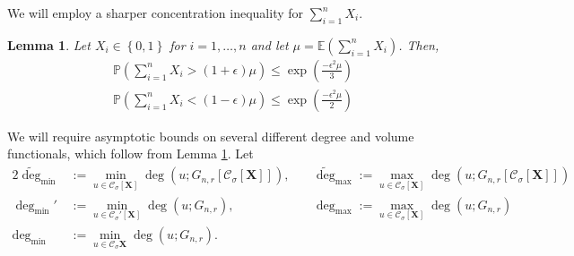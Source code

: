 \documentclass{article}
\newcommand{\set}[1]{\left\{#1\right\}}
\newcommand{\1}{\mathbf{1}}
\newcommand{\degminpr}{\deg_{\min}'}
\newcommand{\degminwt}{\widetilde{\deg}_{\min}}
\newcommand{\degmaxwt}{\widetilde{\deg}_{\max}}
\newcommand{\degmax}{\deg_{\max}}
\newcommand{\degmin}{\deg_{\min}}
\newcommand{\Xbf}{\mathbf{X}}
\newcommand{\Pbb}{\mathbb{P}}
\newcommand{\Ebb}{\mathbb{E}}
\newcommand{\Cset}{\mathcal{C}}
\newcommand{\Csig}{\Cset_{\sigma}}
\theoremstyle{aldenthm}
\newtheorem{lemma}{Lemma}
\begin{document}
We will employ a sharper concentration inequality for $\sum_{i = 1}^{n} X_i$.
\begin{lemma}
	\label{lem: multiplicative_Hoeffding}
	Let $X_i \in \set{0,1}$ for $i = 1, \ldots, n$ and let $\mu = \Ebb(\sum_{i = 1}^n X_i)$. Then,
	\begin{align*}
	\Pbb\left(\sum_{i=1}^{n}X_i > (1 + \epsilon) \mu \right) \leq \exp \left(\frac{-\epsilon^2 \mu}{3}\right) \\
	\Pbb\left(\sum_{i=1}^{n}X_i < (1 - \epsilon) \mu \right) \leq \exp \left(\frac{-\epsilon^2 \mu}{2}\right)
	\end{align*}
\end{lemma}

We will require asymptotic bounds on several different degree and volume functionals, which follow from Lemma \ref{lem: multiplicative_Hoeffding}. Let
\begin{alignat*}{2}
\degminwt & := \min_{u \in \Csig[\Xbf]} \deg(u; G_{n,r}\left[\Csig[\Xbf]\right]),~ && \degmaxwt := \max_{u \in \Csig[\Xbf]} \deg(u; G_{n,r}\left[\Csig[\Xbf]\right]) \\ 
\degminpr & := \min_{u \in \Csig'[\Xbf]} \deg(u; G_{n,r}),~ && \degmax := \max_{u \in \Csig[\Xbf]} \deg(u; G_{n,r}) \\
\degmin & := \min_{u \in \Csig{\Xbf}} \deg(u; G_{n,r}).
\end{alignat*}
\end{document}
